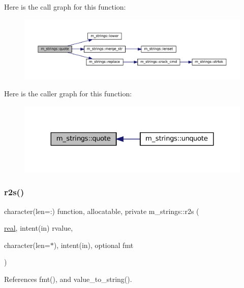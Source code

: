 Here is the call graph for this function\+:
\nopagebreak
\begin{figure}[H]
\begin{center}
\leavevmode
\includegraphics[width=350pt]{namespacem__strings_a3596a4ec755ac897a1dbc0b225d5266a_cgraph}
\end{center}
\end{figure}
Here is the caller graph for this function\+:
\nopagebreak
\begin{figure}[H]
\begin{center}
\leavevmode
\includegraphics[width=324pt]{namespacem__strings_a3596a4ec755ac897a1dbc0b225d5266a_icgraph}
\end{center}
\end{figure}
\mbox{\label{namespacem__strings_ab67ea90007b3f2eb308a5fe8d1cf0df1}} 
\subsubsection{\texorpdfstring{r2s()}{r2s()}}
{\footnotesize\ttfamily character(len=\+:) function, allocatable, private m\+\_\+strings\+::r2s (\begin{DoxyParamCaption}\item[{\mbox{\hyperlink{interfacem__strings_1_1real}{real}}, intent(in)}]{rvalue,  }\item[{character(len=$\ast$), intent(in), optional}]{fmt }\end{DoxyParamCaption})\hspace{0.3cm}{\ttfamily [private]}}



References fmt(), and value\+\_\+to\+\_\+string().

